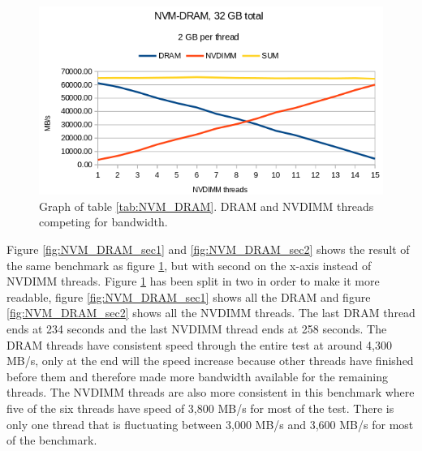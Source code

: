 \documentclass[12pt,a4paper,USenglish]{article}      %
\begin{document}
\begin{figure}[!hbtp]
\includegraphics[scale=0.7]{Benchmarks/NVM-DRAM_32GB_Figure.png}
\caption{Graph of table \ref{tab:NVM_DRAM}. DRAM and NVDIMM threads competing for bandwidth.}
\label{fig:NVM_DRAM}
\end{figure}
\pagebreak
Figure \ref{fig:NVM_DRAM_sec1} and \ref{fig:NVM_DRAM_sec2} shows the result of the same benchmark as figure \ref{fig:NVM_DRAM}, but with second on the x-axis instead of NVDIMM threads. Figure  \ref{fig:NVM_DRAM} has been split in two in order to make it more readable, figure \ref{fig:NVM_DRAM_sec1} shows all the DRAM and figure \ref{fig:NVM_DRAM_sec2} shows all the NVDIMM threads.
The last DRAM thread ends at 234 seconds and the last NVDIMM thread ends at 258 seconds. The DRAM threads have consistent speed through the entire test at around 4,300 MB/s, only at the end will the speed increase because other threads have finished before them and therefore made more bandwidth available for the remaining threads. The NVDIMM threads are also more consistent in this benchmark where five of the six threads have speed of 3,800 MB/s for most of the test. There is only one thread that is fluctuating between 3,000 MB/s and 3,600 MB/s for most of the benchmark.


\end{document}
